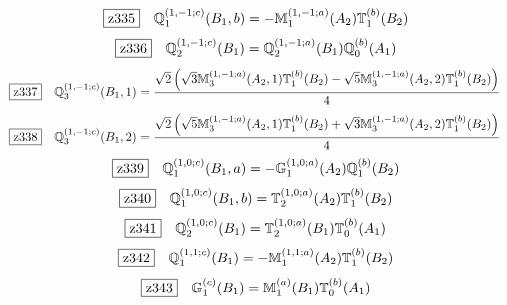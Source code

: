 \documentclass[fleqn,10pt,landscape]{jsarticle}
\begin{document}
\begin{dmath*}
\hspace*{3mm}\fbox{z335}\quad \mathbb{Q}_{1}^{(1,-1;c)}(B_{1},b)=- \mathbb{M}_{1}^{(1,-1;a)}(A_{2}) \mathbb{T}_{1}^{(b)}(B_{2})
\end{dmath*}
\begin{dmath*}
\hspace*{3mm}\fbox{z336}\quad \mathbb{Q}_{2}^{(1,-1;c)}(B_{1})=\mathbb{Q}_{2}^{(1,-1;a)}(B_{1}) \mathbb{Q}_{0}^{(b)}(A_{1})
\end{dmath*}
\begin{dmath*}
\hspace*{3mm}\fbox{z337}\quad \mathbb{Q}_{3}^{(1,-1;c)}(B_{1},1)=\frac{\sqrt{2} \left(\sqrt{3} \mathbb{M}_{3}^{(1,-1;a)}(A_{2},1) \mathbb{T}_{1}^{(b)}(B_{2}) - \sqrt{5} \mathbb{M}_{3}^{(1,-1;a)}(A_{2},2) \mathbb{T}_{1}^{(b)}(B_{2})\right)}{4}
\end{dmath*}
\begin{dmath*}
\hspace*{3mm}\fbox{z338}\quad \mathbb{Q}_{3}^{(1,-1;c)}(B_{1},2)=\frac{\sqrt{2} \left(\sqrt{5} \mathbb{M}_{3}^{(1,-1;a)}(A_{2},1) \mathbb{T}_{1}^{(b)}(B_{2}) + \sqrt{3} \mathbb{M}_{3}^{(1,-1;a)}(A_{2},2) \mathbb{T}_{1}^{(b)}(B_{2})\right)}{4}
\end{dmath*}
\begin{dmath*}
\hspace*{3mm}\fbox{z339}\quad \mathbb{Q}_{1}^{(1,0;c)}(B_{1},a)=- \mathbb{G}_{1}^{(1,0;a)}(A_{2}) \mathbb{Q}_{1}^{(b)}(B_{2})
\end{dmath*}
\begin{dmath*}
\hspace*{3mm}\fbox{z340}\quad \mathbb{Q}_{1}^{(1,0;c)}(B_{1},b)=\mathbb{T}_{2}^{(1,0;a)}(A_{2}) \mathbb{T}_{1}^{(b)}(B_{2})
\end{dmath*}
\begin{dmath*}
\hspace*{3mm}\fbox{z341}\quad \mathbb{Q}_{2}^{(1,0;c)}(B_{1})=\mathbb{T}_{2}^{(1,0;a)}(B_{1}) \mathbb{T}_{0}^{(b)}(A_{1})
\end{dmath*}
\begin{dmath*}
\hspace*{3mm}\fbox{z342}\quad \mathbb{Q}_{1}^{(1,1;c)}(B_{1})=- \mathbb{M}_{1}^{(1,1;a)}(A_{2}) \mathbb{T}_{1}^{(b)}(B_{2})
\end{dmath*}
\begin{dmath*}
\hspace*{3mm}\fbox{z343}\quad \mathbb{G}_{1}^{(c)}(B_{1})=\mathbb{M}_{1}^{(a)}(B_{1}) \mathbb{T}_{0}^{(b)}(A_{1})
\end{dmath*}
\end{document}
